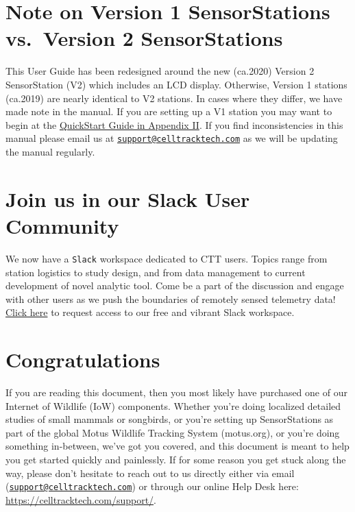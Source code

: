 \documentclass[
]{article}
\begin{document}
\hypertarget{note-on-version-1-sensorstations-vs.-version-2-sensorstations}{%
\section{Note on Version 1 SensorStations vs.~Version 2
SensorStations}\label{note-on-version-1-sensorstations-vs.-version-2-sensorstations}}

This User Guide has been redesigned around the new (ca.2020) Version 2
SensorStation (V2) which includes an LCD display. Otherwise, Version 1
stations (ca.2019) are nearly identical to V2 stations. In cases where
they differ, we have made note in the manual. If you are setting up a V1
station you may want to begin at the
\protect\hyperlink{V1Quickstart}{QuickStart Guide in Appendix II}. If
you find inconsistencies in this manual please email us at
\href{mailto:support@celltracktech.com}{\nolinkurl{support@celltracktech.com}}
as we will be updating the manual regularly.

\hypertarget{join-us-in-our-slack-user-community}{%
\section{\texorpdfstring{Join us in our \textbf{Slack} User
Community}{Join us in our Slack User Community}}\label{join-us-in-our-slack-user-community}}

We now have a \texttt{Slack} workspace dedicated to CTT users. Topics
range from station logistics to study design, and from data management
to current development of novel analytic tool. Come be a part of the
discussion and engage with other users as we push the boundaries of
remotely sensed telemetry data!
\href{https://celltracktech.com/support-ctt-slack/}{Click here} to
request access to our free and vibrant Slack workspace.

\hypertarget{congratulations}{%
\section{Congratulations}\label{congratulations}}

If you are reading this document, then you most likely have purchased
one of our Internet of Wildlife (IoW) components. Whether you're doing
localized detailed studies of small mammals or songbirds, or you're
setting up SensorStations as part of the global Motus Wildlife Tracking
System (motus.org), or you're doing something in-between, we've got you
covered, and this document is meant to help you get started quickly and
painlessly. If for some reason you get stuck along the way, please don't
hesitate to reach out to us directly either via email
(\href{mailto:support@celltracktech.com}{\nolinkurl{support@celltracktech.com}})
or through our online Help Desk here:
\url{https://celltracktech.com/support/}.
\end{document}
